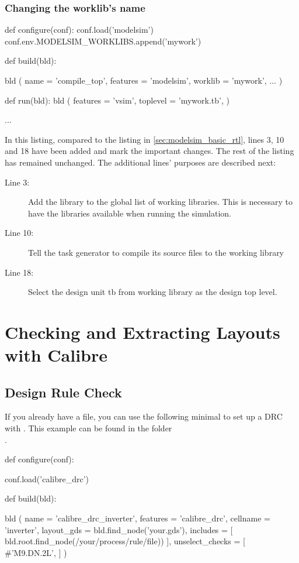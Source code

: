 \subsubsection{Changing the worklib's name}
\begin{lstwscript}
def configure(conf):
    conf.load('modelsim')
    conf.env.MODELSIM_WORKLIBS.append('mywork')

def build(bld):

    bld (
        name = 'compile_top',
        features = 'modelsim',
        worklib = 'mywork',
        ...
    )   


def run(bld):
    bld (
        features = 'vsim',
        toplevel = 'mywork.tb',
    )   

...
\end{lstwscript}
In this listing, compared to the listing in \cref{sec:modelsim_basic_rtl},
lines 3, 10 and 18 have been added and mark the important changes. The rest of
the listing has remained unchanged. The additional lines' purposes are
described next:
\begin{description}
    \item[Line 3:] Add the library to the global list of working libraries.
		This is necessary to have the libraries available when running the
		simulation.
    \item[Line 10:] Tell the task generator to compile its source files to the
		working library 
	\item[Line 18:] Select the design unit tb from working library 
		as the design top level.
\end{description}

\section{Checking and Extracting Layouts with Calibre}
\label{sec:calibre_recipes}
\subsection{Design Rule Check}
\label{sec:calibre_recipes_drc}
If you already have a  file, you can use the following minimal
 to set up a \gls{DRC} with .
This example can be found in the folder\\
.
\begin{lstwscript}
def configure(conf):

    conf.load('calibre_drc')

def build(bld):

    bld (
        name = 'calibre_drc_inverter',
        features = 'calibre_drc',
        cellname = 'inverter',
        layout_gds = bld.find_node('your.gds'),
        includes = [
            bld.root.find_node(/your/process/rule/file))
        ],
        unselect_checks = [
            #'M9.DN.2L',
        ]
    )

\end{lstwscript}

